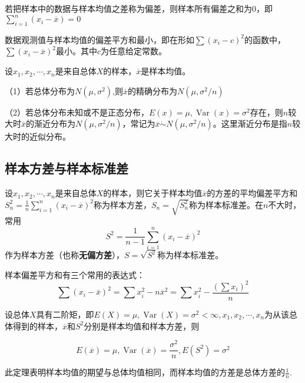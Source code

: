 \begin{theorem}
    若把样本中的数据与样本均值之差称为偏差，则样本所有偏差之和为$0$，即\\
    $\sum_{i=1}^n(x_i-\overline{x})=0$
\end{theorem}
\begin{theorem}
    数据观测值与样本均值的偏差平方和最小，即在形如$\sum (x_i - c)^2$的函数中，$\sum (x_i - \overline{x})^2$最小。其中$c$为任意给定常数。
\end{theorem}

\begin{theorem}
    设$x_1,x_2,\cdots,x_n$是来自总体$X$的样本，$\overline{x}$是样本均值。

    （1）若总体分布为$N(\mu,\sigma^2)$,则$\overline{x}$的精确分布为$N(\mu,\sigma^2 / n)$

    （2）若总体分布未知或不是正态分布，$E(x)=\mu,\operatorname{Var}(x)=\sigma^2$存在，则$n$较大时$\overline{x}$的渐近分布为$N(\mu,\sigma^2 / n)$，常记为$\overline{x}\dot{\sim} N(\mu,\sigma^2 / n)$。这里渐近分布是指$n$较大时的近似分布。
\end{theorem}


\subsection{样本方差与样本标准差}
\begin{definition}
    设$x_1,x_2,\cdots,x_n$是来自总体$X$的样本，则它关于样本均值$\overline{x}$的方差的平均偏差平方和$S_n^2=\frac{1}{n}\sum_{i=1}^{n}(x_i-\overline{x})^2$称为样本方差，$S_n=\sqrt{S_n^2}$称为样本标准差。在$n$不大时，常用
    $$
        S^2=\frac{1}{n-1}\sum_{i=1}^{n}(x_i-\overline{x})^2
    $$
    作为样本方差（也称\textbf{无偏方差}），$S=\sqrt{S^2}$称为样本标准差。
\end{definition}
样本偏差平方和有三个常用的表达式：
\begin{equation}
    \sum (x_i - \overline{x})^2 = \sum x_i^2 - n\overline{x}^2 = \sum x_i^2 - \frac{(\sum x_i)^2}{n}
\end{equation}
\begin{theorem}
    设总体$X$具有二阶矩，即$E(X)=\mu,\operatorname{Var}(X)=\sigma^2 < \infty,x_1 , x_2 , \cdots, x_n$为从该总体得到的样本，$\overline{x}$和$S^2$分别是样本均值和样本方差，则

    $$
        E(\overline{x})=\mu,\operatorname{Var}(\overline{x})=\frac{\sigma^2}{n},E(S^2)=\sigma^2
    $$
\end{theorem}
此定理表明样本均值的期望与总体均值相同，而样本均值的方差是总体方差的$\frac{1}{n}$.

